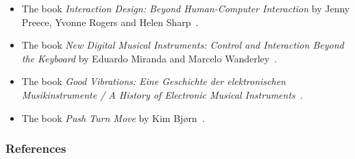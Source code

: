 \documentclass[screen, aspectratio=169]{beamer}
\begin{document}
\begin{frame}
\begin{figure}
\end{figure}
\begin{itemize}
\item The book \emph{Interaction Design: Beyond Human-Computer Interaction} by Jenny Preece, Yvonne Rogers and Helen Sharp~\cite{Preece.et.al.2015.ic-book}.
\item The book \emph{New Digital Musical Instruments: Control and Interaction Beyond the Keyboard} by Eduardo Miranda and  Marcelo Wanderley~\cite{Miranda.Wanderley.2006}.
\item The book \emph{Good Vibrations: Eine Geschichte der elektronischen Musikinstrumente / A History of Electronic Musical Instruments}~\cite{Brilmayer.et.al.2018.goodvibrations}.
\item The book \emph{Push Turn Move} by Kim Bj{\o}rn~\cite{Bjorn.2017.pushturnmove}.
\end{itemize}
\end{frame}
%
\begin{frame}
  \frametitle{References}
  \printbibliography
\end{frame}
%
\end{document}
